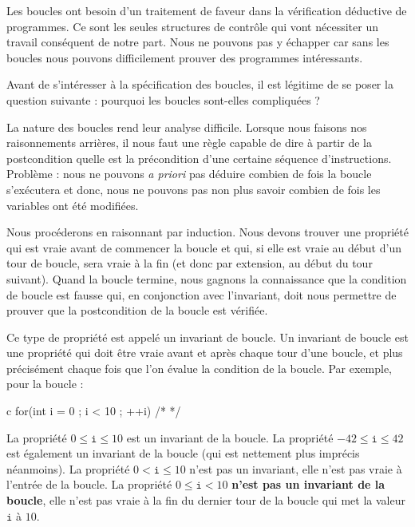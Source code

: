 Les boucles ont besoin d'un traitement de faveur dans la vérification déductive
de programmes. Ce sont les seules structures de contrôle qui vont nécessiter un
travail conséquent de notre part. Nous ne pouvons pas y échapper car sans les
boucles nous pouvons difficilement prouver des programmes intéressants.



Avant de s'intéresser à la spécification des boucles, il est légitime de se
poser la question suivante : pourquoi les boucles sont-elles compliquées ?



\label{l3:statements-loops-invariant}


La nature des boucles rend leur analyse difficile. Lorsque nous faisons nos
raisonnements arrières, il nous faut une règle capable de dire à partir de la
postcondition quelle est la précondition d'une certaine séquence
d'instructions. Problème : nous ne pouvons \textit{a priori} pas déduire combien de
fois la boucle s'exécutera et donc, nous ne pouvons pas non
plus savoir combien de fois les variables ont été modifiées.



Nous procéderons en raisonnant par induction. Nous devons trouver une
propriété qui est vraie avant de commencer la boucle et qui, si elle est vraie
au début d'un tour de boucle, sera vraie à la fin (et donc par extension, au
début du tour suivant). Quand la boucle termine, nous gagnons la connaissance
que la condition de boucle est fausse qui, en conjonction avec l'invariant,
doit nous permettre de prouver que la postcondition de la boucle est vérifiée.



Ce type de propriété est appelé un invariant de boucle. Un invariant de boucle
est une propriété qui doit être vraie avant et après chaque tour d'une boucle,
et plus précisément chaque fois que l'on évalue la condition de la boucle.
Par exemple, pour la boucle :



\begin{CodeBlock}{c}
for(int i = 0 ; i < 10 ; ++i){ /* */ }
\end{CodeBlock}



La propriété $0 \leq \texttt{i} \leq 10$ est un invariant de la boucle. La
propriété  $-42 \leq \texttt{i} \leq 42$ est également un invariant de la boucle
(qui est nettement plus imprécis néanmoins). La propriété $0 < \texttt{i} \leq 10$
n'est pas un invariant, elle n'est pas vraie à l'entrée de la boucle. La propriété
$0 \leq \texttt{i} < 10$ \textbf{n'est pas un invariant de la boucle}, elle n'est
pas vraie à la fin du dernier tour de la boucle qui met la valeur $\texttt{i}$ à
$10$.



